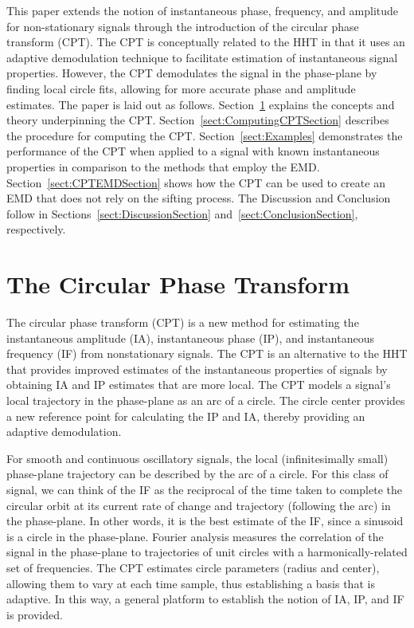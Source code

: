 \documentclass[a4paper]{IEEEtran}
\begin{document}
This paper extends the notion of instantaneous phase, frequency, and amplitude for non-stationary signals through the introduction of the circular phase transform (CPT). The CPT is conceptually related to the HHT in that it uses an adaptive demodulation technique to facilitate estimation of instantaneous signal properties. However, the CPT demodulates the signal in the phase-plane by finding local circle fits, allowing for more accurate phase and amplitude estimates. The paper is laid out as follows. Section~\ref{sect:CPTDescriptionSection} explains the concepts and theory underpinning the CPT. Section~\ref{sect:ComputingCPTSection} describes the procedure for computing the CPT. Section~\ref{sect:Examples} demonstrates the performance of the CPT when applied to a signal with known instantaneous properties in comparison to the methods that employ the EMD. Section~\ref{sect:CPTEMDSection} shows how the CPT can be used to create an EMD that does not rely on the sifting process. %
The Discussion and Conclusion follow in Sections~\ref{sect:DiscussionSection} and~\ref{sect:ConclusionSection}, respectively. 

\section{The Circular Phase Transform}\label{sect:CPTDescriptionSection}
The circular phase transform (CPT) is a new method for estimating the instantaneous amplitude (IA), instantaneous phase (IP), and instantaneous frequency (IF) from nonstationary signals. The CPT is an alternative to the HHT that provides improved estimates of the instantaneous properties of signals by obtaining IA and IP estimates that are more local. The CPT models a signal's local trajectory in the phase-plane as an arc of a circle. The circle center provides a new reference point for calculating the IP and IA, thereby providing an adaptive demodulation.

For smooth and continuous oscillatory signals, the local (infinitesimally small) phase-plane trajectory can be described by the arc of a circle. For this class of signal, we can think of the IF as the reciprocal of the time taken to complete the circular orbit at its current rate of change and trajectory (following the arc) in the phase-plane. In other words, it is the best estimate of the IF, since a sinusoid is a circle in the phase-plane. Fourier analysis measures the correlation of the signal in the phase-plane to trajectories of unit circles with a harmonically-related set of frequencies. The CPT estimates circle parameters (radius and center), allowing them to vary at each time sample, thus establishing a basis that is adaptive. In this way, a general platform to establish the notion of IA, IP, and IF is provided.
\end{document}
